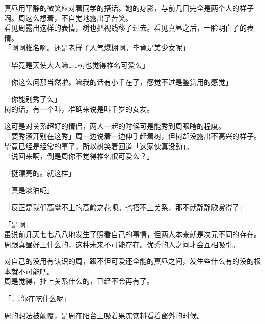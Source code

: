 真昼用平静的微笑应对着同学的搭话。她的身影，与前几日完全是两个人的样子啊。周这么想着，不自觉地露出了苦笑。\\

看见周露出这样的表情，树也把视线移了过去。看见真昼之后，一脸明白了的表情。\\

「啊啊椎名啊。还是老样子人气爆棚啊。毕竟是美少女呢」

「毕竟是天使大人嘛……树也觉得椎名可爱么」

「你这么问那当然啦。嘛我的话有小千在了，感觉不过是鉴赏用的感觉」

「你能别秀了么」\\

树的话，有一个叫，准确来说是叫千岁的女友。

这可是对关系超好的情侣，两人一起的时候可是能秀到周眼瞎的程度。\\

「要秀滚开别在这秀」周一边说着一边伸手赶着树，但树却没露出不高兴的样子。毕竟已经是经常的事了，所以树笑着回道「这家伙真没劲」。\\

「说回来啊，倒是周你不觉得椎名很可爱么？」

「挺漂亮的。就这样」

「真是淡泊呢」

「反正是我们高攀不上的高岭之花呗。也搭不上关系，那不就静静欣赏得了」

「是啊」\\

虽说前几天七七八八地发生了照看自己的事情，但两人本来就是次元不同的存在。\\

周跟真昼好上什么的，这种未来不可能存在。优秀的人之间才会互相吸引。

对自己的没用有认识的周，跟不但可爱还全能的真昼之间，发生些什么有的没的根本就不可能吧。\\

周是觉得，扯上关系什么的，已经不会再有了。\\

\vspace{2\baselineskip}

「……你在吃什么呢」

周的想法被颠覆，是周在阳台上吸着果冻饮料看着窗外的时候。
